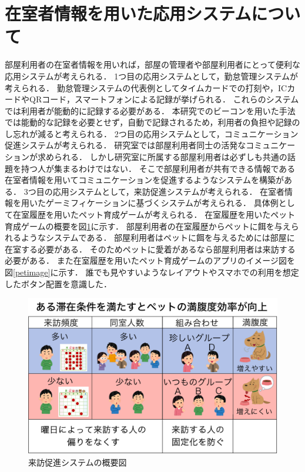 
\section{在室者情報を用いた応用システムについて}\label{3.4}
部屋利用者の在室者情報を用いれば，部屋の管理者や部屋利用者にとって便利な応用システムが考えられる．
1つ目の応用システムとして，勤怠管理システムが考えられる．
勤怠管理システムの代表例としてタイムカードでの打刻や，ICカードやQRコード，スマートフォンによる記録が挙げられる．
これらのシステムでは利用者が能動的に記録する必要がある．
本研究でのビーコンを用いた手法では能動的な記録を必要とせず，自動で記録されるため，利用者の負担や記録のし忘れが減ると考えられる．
2つ目の応用システムとして，コミュニケーション促進システムが考えられる．
研究室では部屋利用者同士の活発なコミュニケーションが求められる．
しかし研究室に所属する部屋利用者は必ずしも共通の話題を持つ人が集まるわけではない．
そこで部屋利用者が共有できる情報である在室者情報を用いてコミュニケーションを促進するようなシステムを構築がある．
3つ目の応用システムとして，来訪促進システムが考えられる．
在室者情報を用いたゲーミフィケーションに基づくシステムが考えられる．
具体例として在室履歴を用いたペット育成ゲームが考えられる．
在室履歴を用いたペット育成ゲームの概要を図\ref{petgaiyou}に示す．
部屋利用者の在室履歴からペットに餌を与えられるようなシステムである．
部屋利用者はペットに餌を与えるためには部屋に在室する必要がある．
そのためペットに愛着があるなら部屋利用者は来訪する必要がある．
また在室履歴を用いたペット育成ゲームのアプリのイメージ図を図\ref{petimage}に示す．
誰でも見やすいようなレイアウトやスマホでの利用を想定したボタン配置を意識した．
\begin{figure}[H]
  \begin{center}
    \includegraphics[width=160mm]{image/petgaiyou.pdf}
    \caption{来訪促進システムの概要図}
    \label{petgaiyou}
  \end{center}
\end{figure}

